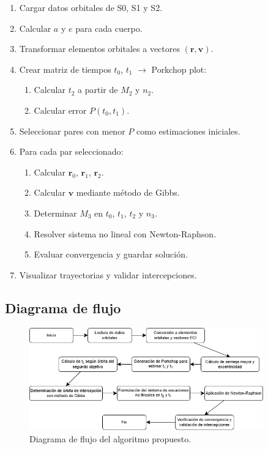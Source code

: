 \begin{enumerate}
    \item Cargar datos orbitales de S0, S1 y S2.
    \item Calcular $a$ y $e$ para cada cuerpo.
    \item Transformar elementos orbitales a vectores $(\mathbf{r}, \mathbf{v})$.
    \item Crear matriz de tiempos $t_0$, $t_1$ $\rightarrow$ Porkchop plot:
          \begin{enumerate}
              \item Calcular $t_2$ a partir de $M_2$ y $n_2$.
              \item Calcular error $P(t_0, t_1)$.
          \end{enumerate}
    \item Seleccionar pares con menor $P$ como estimaciones iniciales.
    \item Para cada par seleccionado:
          \begin{enumerate}
              \item Calcular $\mathbf{r}_0$, $\mathbf{r}_1$, $\mathbf{r}_2$.
              \item Calcular $\mathbf{v}$ mediante método de Gibbs.
              \item Determinar $M_3$ en $t_0$, $t_1$, $t_2$ y $n_3$.
              \item Resolver sistema no lineal con Newton-Raphson.
              \item Evaluar convergencia y guardar solución.
          \end{enumerate}
    \item Visualizar trayectorias y validar intercepciones.
\end{enumerate}

\subsection{Diagrama de flujo}

\begin{figure}[H]
    \centering
    \includegraphics[width=0.9\textwidth]{flowchart.png}
    \caption{Diagrama de flujo del algoritmo propuesto.}
    \label{fig:flowchart}
\end{figure}

